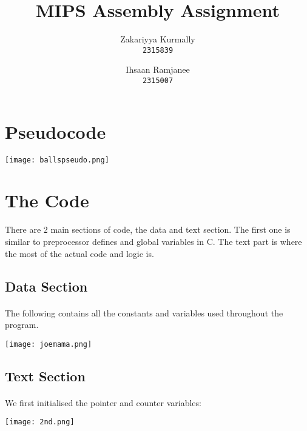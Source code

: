 \documentclass{article}
\title{MIPS Assembly Assignment}
\author{
  Zakariyya Kurmally \\
  \texttt{2315839}
  \and
  Ihsaan Ramjanee \\
  \texttt{2315007}
}
\begin{document}
\maketitle

\pagebreak

\tableofcontents

\pagebreak

\section{Pseudocode}
\begin{center}
  \texttt{[image: ballspseudo.png]}
\end{center}

\section{The Code}
There are 2 main sections of code, the data and text section. The first
one is similar to preprocessor defines and global variables in C. 
The text part is where the most of the actual code and logic is. 

\pagebreak

\subsection{Data Section}
\paragraph{}
The following contains all the constants and variables used throughout the 
program. 

\begin{center}
  \texttt{[image: joemama.png]}
\end{center}

\subsection{Text Section}
\paragraph{}
We first initialised the pointer and counter variables:

\begin{center}
  \texttt{[image: 2nd.png]}
\end{center}
\end{document}
